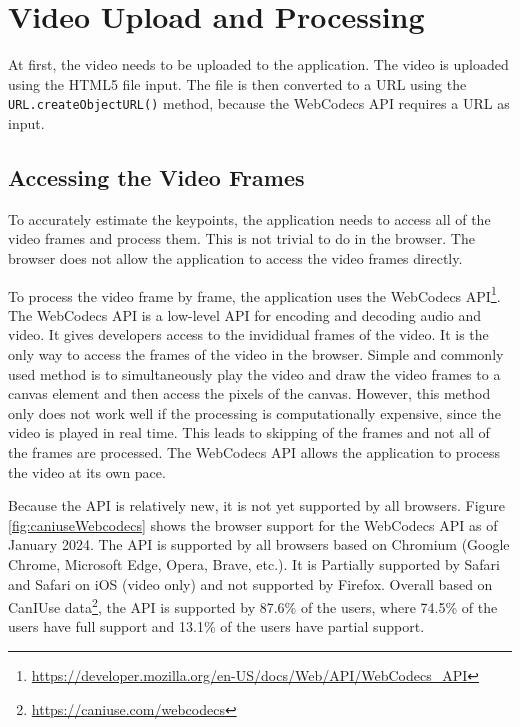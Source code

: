 \section{Video Upload and Processing}
\label{video_upload_and_processing}
At first, the video needs to be uploaded to the application. The video is uploaded using the HTML5 file input. The file is then converted to a URL using the \texttt{URL.createObjectURL()} method, because the WebCodecs API requires a URL as input.

\subsection{Accessing the Video Frames}

To accurately estimate the keypoints, the application needs to access all of the video frames and process them. This is not trivial to do in the browser. The browser does not allow the application to access the video frames directly.

To process the video frame by frame, the application uses the WebCodecs API\footnote{\url{https://developer.mozilla.org/en-US/docs/Web/API/WebCodecs_API}}. The WebCodecs API is a low-level API for encoding and decoding audio and video. It gives developers access to the invididual frames of the video. It is the only way to access the frames of the video in the browser. Simple and commonly used method is to simultaneously play the video and draw the video  frames to a canvas element and then access the pixels of the canvas. However, this method only does not work well if the processing is computationally expensive, since the video is played in real time. This leads to skipping of the frames and not all of the frames are processed. The WebCodecs API allows the application to process the video at its own pace.

Because the API is relatively new, it is not yet supported by all browsers. Figure \ref{fig:caniuseWebcodecs} shows the browser support for the WebCodecs API as of January 2024. The API is supported by all browsers based on Chromium (Google Chrome, Microsoft Edge, Opera, Brave, etc.). It is Partially supported by Safari and Safari on iOS (video only) and not supported by Firefox. Overall based on CanIUse data\footnote{\url{https://caniuse.com/webcodecs}}, the API is supported by 87.6\% of the users, where 74.5\% of the users have full support and 13.1\% of the users have partial support.


